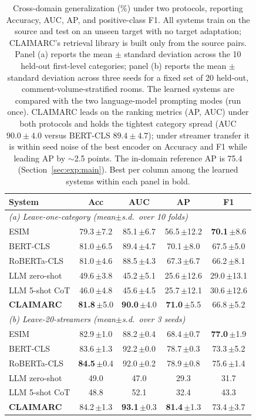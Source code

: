 \documentclass[11pt]{article}
\newcommand{\best}[1]{\textbf{#1}}
\begin{document}
\begin{table}[t]
\centering\small
\setlength{\tabcolsep}{6pt}
\newcommand{\pmsd}[1]{\,{\scriptsize$\pm$#1}}
\begin{tabular}{lcccc}
\toprule
\textbf{System} & \textbf{Acc} & \textbf{AUC} & \textbf{AP} & \textbf{F1} \\
\midrule
\multicolumn{5}{l}{\textit{(a) Leave-one-category (mean$\pm$s.d.\ over 10 folds)}} \\
ESIM           & 79.3\pmsd{7.2} & 85.1\pmsd{6.7} & 56.5\pmsd{12.2} & \best{70.1}\pmsd{8.6} \\
BERT-CLS       & 81.0\pmsd{6.5} & 89.4\pmsd{4.7} & 70.1\pmsd{8.0} & 67.5\pmsd{5.0} \\
RoBERTa-CLS    & 81.0\pmsd{4.6} & 88.5\pmsd{4.3} & 67.3\pmsd{6.7} & 66.2\pmsd{8.1} \\
LLM zero-shot  & 49.6\pmsd{3.8} & 45.2\pmsd{5.1} & 25.6\pmsd{12.6} & 29.0\pmsd{13.1} \\
LLM 5-shot CoT & 46.0\pmsd{4.8} & 45.6\pmsd{4.5} & 25.7\pmsd{12.1} & 30.6\pmsd{12.6} \\
\textbf{CLAIMARC} & \best{81.8}\pmsd{5.0} & \best{90.0}\pmsd{4.0} & \best{71.0}\pmsd{5.5} & 66.8\pmsd{5.2} \\
\midrule
\multicolumn{5}{l}{\textit{(b) Leave-20-streamers (mean$\pm$s.d.\ over 3 seeds)}} \\
ESIM           & 82.9\pmsd{1.0} & 88.2\pmsd{0.4} & 68.4\pmsd{0.7} & \best{77.0}\pmsd{1.9} \\
BERT-CLS       & 83.6\pmsd{1.3} & 92.2\pmsd{0.0} & 78.7\pmsd{0.3} & 73.3\pmsd{5.2} \\
RoBERTa-CLS    & \best{84.5}\pmsd{0.4} & 92.0\pmsd{0.2} & 78.9\pmsd{0.8} & 75.6\pmsd{1.4} \\
LLM zero-shot  & 49.0 & 47.0 & 29.3 & 31.7 \\
LLM 5-shot CoT & 48.8 & 52.1 & 32.4 & 43.3 \\
\textbf{CLAIMARC} & 84.2\pmsd{1.3} & \best{93.1}\pmsd{0.3} & \best{81.4}\pmsd{1.3} & 73.4\pmsd{3.7} \\
\bottomrule
\end{tabular}
\caption{Cross-domain generalization (\%) under two protocols, reporting
Accuracy, AUC, AP, and positive-class F1. All systems train on the source and
test on an unseen target with no target adaptation; CLAIMARC's retrieval library
is built only from the source pairs. Panel (a) reports the mean $\pm$ standard
deviation across the 10 held-out first-level categories; panel (b) reports the
mean $\pm$ standard deviation across three seeds for a fixed set of 20
held-out, comment-volume-stratified rooms. The learned systems are compared with
the two language-model prompting modes (run once). CLAIMARC leads on the ranking
metrics (AP, AUC) under both protocols and holds the tightest category spread
(AUC $90.0\pm4.0$ versus BERT-CLS $89.4\pm4.7$); under streamer transfer it is
within seed noise of the best encoder on Accuracy and F1 while leading AP by
$\sim$2.5 points. The in-domain reference AP is 75.4
(Section~\ref{sec:exp:main}). Best per column among the learned systems within
each panel in bold.}
\label{tab:xdom}
\end{table}
\end{document}
